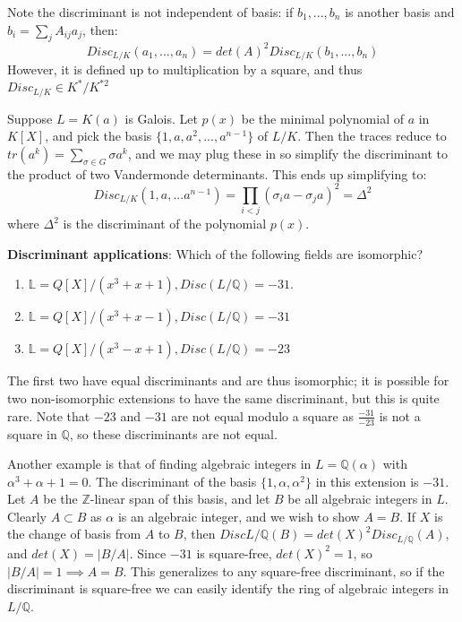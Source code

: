 \documentclass[11pt, oneside]{amsart}   	%
\theoremstyle{definition}
\begin{document}
\begin{itemize}
	Note the discriminant is not independent of basis: if $b_1, ..., b_n$ is another basis and $b_i = \sum_jA_{ij}a_j$, then:
	$$
		Disc_{L / K}(a_1, ..., a_n) = det(A)^2 Disc_{L / K}(b_1, ..., b_n)
	$$
	However, it is defined up to multiplication by a square, and thus $Disc_{L / K}\in K^* / K^{*2}$
	
	Suppose $L = K(a)$ is Galois. Let $p(x)$ be the minimal polynomial of $a$ in $K[X]$, and pick the basis $\{1, a, a^2, ..., a^{n - 1}\}$ of $L / K$. Then 
	the traces reduce to $tr(a^k) = \sum_{\sigma\in G}\sigma a^k$, and we may plug these in so simplify the discriminant to the product of two 
	Vandermonde determinants. This ends up simplifying to:
	$$
		Disc_{L / K}(1, a, ... a^{n - 1}) = \prod_{i < j}(\sigma_i a - \sigma_j a)^2 = \Delta^2
	$$
	where $\Delta^2$ is the discriminant of the polynomial $p(x)$.
	
	\textbf{Discriminant applications}: Which of the following fields are isomorphic? 
	\begin{enumerate}
		\item $\mathbb L = Q[X] / (x^3 + x + 1), Disc(L / \mathbb Q) = -31$.
		\item $\mathbb L = Q[X] / (x^3 + x - 1), Disc(L / \mathbb Q) = -31$
		\item $\mathbb L = Q[X] / (x^3 - x + 1), Disc(L / \mathbb Q) = -23$
	\end{enumerate}
	The first two have equal discriminants and are thus isomorphic; it is possible for two non-isomorphic extensions to have the same discriminant, but this 
	is quite rare. Note that $-23$ and $-31$ are not equal modulo a square as $\frac{-31}{-23}$ is not a square in $\mathbb Q$, so these discriminants are 
	not equal.
	
	Another example is that of finding algebraic integers in $L = \mathbb Q(\alpha)$ with $\alpha^3 + \alpha + 1 = 0$. The discriminant of the basis $\{1, 
	\alpha, \alpha^2\}$ in this extension is $-31$. Let $A$ be the $\mathbb Z$-linear span of this basis, and let $B$ be all algebraic integers in $L$. Clearly 
	$A\subset B$ as $\alpha$ is an algebraic integer, and we wish to show $A = B$. If $X$ is the change of basis from $A$ to $B$, then $Disc{L / 
	\mathbb Q}(B) = det(X)^2Disc_{L / \mathbb Q}(A)$, and $det(X) = |B / A|$. Since $-31$ is square-free, $det(X)^2 = 1$, so $|B / A| = 1\implies A = B$. 
	This generalizes to any square-free discriminant, so if the discriminant is square-free we can easily identify the ring of algebraic integers in $L/ \mathbb 
	Q$. 


\end{itemize}
\end{document}

